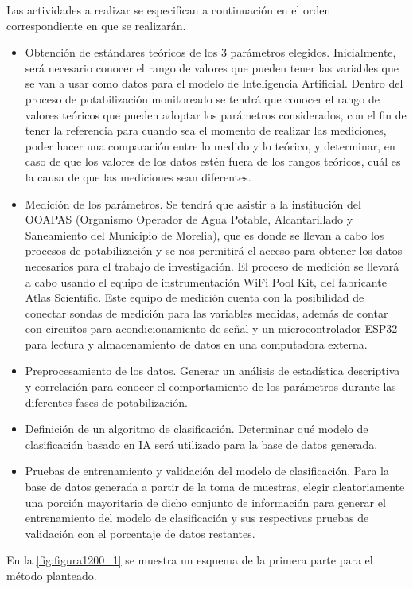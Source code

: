Las actividades a realizar se especifican a continuación en el orden correspondiente
en que se realizarán.
\begin{itemize}
	\item Obtención de estándares teóricos de los 3 parámetros elegidos. Inicialmente,
	será necesario conocer el rango de valores que pueden tener las variables que se
	van a usar como datos para el modelo de Inteligencia 
	Artificial. Dentro del proceso de potabilización monitoreado se tendrá
	que conocer el rango de valores teóricos que pueden adoptar los parámetros 
	considerados, con el fin de tener la referencia para cuando sea
	el momento de realizar las mediciones, poder hacer una comparación entre lo 
	medido y lo teórico, y determinar, en caso de que los valores de los datos estén 
	fuera de los rangos teóricos, cuál es la causa de que las mediciones sean 
	diferentes.
	\item Medición de los parámetros. Se tendrá que asistir a la institución del 
	OOAPAS (Organismo Operador de Agua Potable, Alcantarillado y Saneamiento del 
	Municipio de Morelia), que es donde se llevan a cabo los procesos de potabilización
	y se nos permitirá el acceso para obtener los datos necesarios para el trabajo de
	investigación. El proceso de medición se llevará a cabo usando el equipo de 
	instrumentación WiFi Pool Kit, del fabricante Atlas Scientific. 
	Este equipo de medición cuenta con la posibilidad de conectar sondas de medición para las variables medidas, además de contar con circuitos para acondicionamiento de señal y un microcontrolador ESP32 para lectura y 
	almacenamiento de datos en una computadora externa. 
	\item Preprocesamiento de los datos. Generar un análisis de estadística descriptiva y correlación para conocer el comportamiento de los parámetros durante las diferentes fases de potabilización.
	\item Definición de un algoritmo de clasificación. Determinar qué modelo de clasificación basado en IA será utilizado para la base de datos generada. 
	\item Pruebas de entrenamiento y validación del modelo de clasificación. Para la base de datos generada a partir de la toma de muestras, elegir aleatoriamente una porción mayoritaria de dicho conjunto de información 
	para generar el entrenamiento del modelo de clasificación y sus respectivas pruebas de validación con el porcentaje de datos restantes.
\end{itemize}

En la \autoref{fig:figura1200_1} se muestra un esquema de la primera parte para el método planteado.

